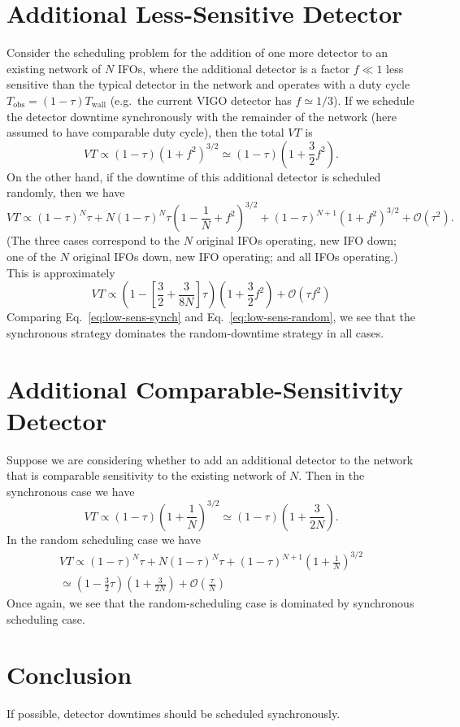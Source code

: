 \documentclass[modern]{aastex63}
\begin{document}
\section{Additional Less-Sensitive Detector}

Consider the scheduling problem for the addition of one more detector to an
existing network of $N$ \acp{IFO}, where the additional detector is a factor $f
\ll 1$ less sensitive than the typical detector in the network and operates with
a duty cycle $T_\mathrm{obs} = (1-\tau) T_\mathrm{wall}$ (e.g.\ the current VIGO
detector has $f \simeq 1/3$).  If we schedule the detector downtime
synchronously with the remainder of the network (here assumed to have comparable
duty cycle), then the total $VT$ is
%
\begin{equation}
  \label{eq:low-sens-synch}
  VT \propto (1-\tau) \left( 1 + f^2 \right)^{3/2} \simeq (1-\tau) \left( 1 + \frac{3}{2} f^2 \right).
\end{equation}
%
On the other hand, if the downtime of this additional detector is scheduled
randomly, then we have
%
\begin{equation}
  VT \propto (1-\tau)^N \tau + N (1-\tau)^{N} \tau \left( 1 - \frac{1}{N} + f^2 \right)^{3/2} + (1-\tau)^{N+1} \left( 1 + f^2 \right)^{3/2} + \mathcal{O}\left(\tau^2\right).
\end{equation}
%
(The three cases correspond to the $N$ original \acp{IFO} operating, new
\ac{IFO} down; one of the $N$ original \acp{IFO} down, new \ac{IFO} operating;
and all \acp{IFO} operating.)  This is approximately
%
\begin{equation}
  \label{eq:low-sens-random}
  VT \propto \left( 1 - \left[ \frac{3}{2} + \frac{3}{8N} \right] \tau \right) \left( 1 + \frac{3}{2} f^2\right) + \mathcal{O}\left( \tau f^2 \right)
\end{equation}
%
Comparing Eq.\ \eqref{eq:low-sens-synch} and Eq.\ \eqref{eq:low-sens-random}, we
see that the synchronous strategy dominates the random-downtime strategy in all
cases.

\section{Additional Comparable-Sensitivity Detector}

Suppose we are considering whether to add an additional detector to the network
that is comparable sensitivity to the existing network of $N$.  Then in the
synchronous case we have
%
\begin{equation}
  VT \propto (1-\tau) \left(1 + \frac{1}{N}\right)^{3/2} \simeq (1-\tau) \left( 1 + \frac{3}{2N} \right).
\end{equation}
%
In the random scheduling case we have
%
\begin{multline}
  VT \propto (1-\tau)^N \tau + N (1-\tau)^N \tau + (1-\tau)^{N+1} \left(1 + \frac{1}{N}\right)^{3/2} \\ \simeq \left( 1 - \frac{3}{2} \tau \right) \left( 1 + \frac{3}{2N} \right) + \mathcal{O}\left( \frac{\tau}{N} \right)
\end{multline}
%
Once again, we see that the random-scheduling case is dominated by synchronous
scheduling case.

\section{Conclusion}

If possible, detector downtimes should be scheduled synchronously.


\end{document}
